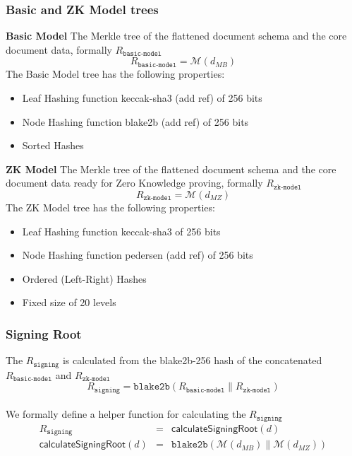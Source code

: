  \subsubsection{Basic and ZK Model trees}
\textbf{Basic Model} The Merkle tree of the flattened document schema and the core document data, formally $R_{{\texttt{basic-model}}}$
\newline
\begin{equation}
    R_{{\texttt{basic-model}}} = \mathcal{M}(d_{MB})
\end{equation}
\newline
The Basic Model tree has the following properties:
\begin{itemize}  
\item Leaf Hashing function keccak-sha3 (add ref) of 256 bits
\item Node Hashing function blake2b (add ref) of 256 bits
\item Sorted Hashes
\end{itemize}
\newline
\textbf{ZK Model} The Merkle tree of the flattened document schema and the core document data ready for Zero Knowledge proving, formally $R_{{\texttt{zk-model}}}$
\newline
\begin{equation}
    R_{{\texttt{zk-model}}} = \mathcal{M}(d_{MZ})
\end{equation}
\newline
The ZK Model tree has the following properties:
\begin{itemize}  
\item Leaf Hashing function keccak-sha3 of 256 bits
\item Node Hashing function pedersen (add ref) of 256 bits
\item Ordered (Left-Right) Hashes
\item Fixed size of 20 levels
\end{itemize}
 \subsubsection{Signing Root}
The $R_{\texttt{signing}}$ is calculated from the blake2b-256 hash of the concatenated $R_\texttt{basic-model}$ and $R_{\texttt{zk-model}}$
\newline
\begin{equation}
R_{\texttt{signing}} = \texttt{blake2b}(R_\texttt{basic-model}\| R_{\texttt{zk-model}})
\end{equation}\\
We formally define a helper function for calculating the $R_{\texttt{signing}}$ 
\begin{eqnarray}
R_{\texttt{signing}}& =&\mathsf{calculateSigningRoot}(d) \\
\mathsf{calculateSigningRoot}(d)& =& \texttt{blake2b}(\mathcal{M}(d_{MB})\| \mathcal{M}(d_{MZ}))
\end{eqnarray}

